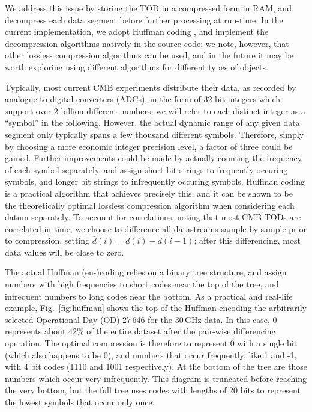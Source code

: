 \documentclass[twocolumn]{aa}
\begin{document}
We address this issue by storing the TOD in a compressed form in RAM,
and decompress each data segment before further processing at
run-time. In the current implementation, we adopt Huffman coding
\citep{Huffman}, and implement the decompression algorithms natively
in the source code; we note, however, that other lossless compression
algorithms can be used, and in the future it may be worth exploring
using different algorithms for different types of objects.

Typically, most current CMB experiments distribute their data, as
recorded by analogue-to-digital converters (ADCs), in the form of
32-bit integers which support over 2 billion different numbers; we
will refer to each distinct integer as a ``symbol'' in the
following. However, the actual dynamic range of any given data segment
only typically spans a few thousand different symbols. Therefore,
simply by choosing a more economic integer precision level, a factor
of three could be gained. Further improvements could be made by
actually counting the frequency of each symbol separately, and assign
short bit strings to frequently occuring symbols, and longer bit
strings to infrequently occuring symbols. Huffman coding is a
practical algorithm that achieves precisely this, and it can be shown
to be the theoretically optimal lossless compression algorithm when
considering each datum separately. To account for correlations, noting
that most CMB TODs are correlated in time, we choose to difference all
datastreams sample-by-sample prior to compression, setting $\bar{d}(i)
= d(i)-d(i-1)$; after this differencing, most data values will be
close to zero.

The actual Huffman (en-)coding relies on a binary tree structure, and
assign numbers with high frequencies to short codes near the top of
the tree, and infrequent numbers to long codes near the bottom.  As a
practical and real-life example, Fig.~\ref{fig:huffman} shows the top
of the Huffman encoding the arbitrarily selected Operational Day (OD)
27\,646 for the 30\,GHz data. In this case, 0 represents about 42\% of
the entire dataset after the pair-wise differencing operation. The
optimal compression is therefore to represent 0 with a single bit
(which also happens to be 0), and numbers that occur frequently, like
1 and -1, with 4 bit codes (1110 and 1001 respectively). At the bottom
of the tree are those numbers which occur very infrequently. This
diagram is truncated before reaching the very bottom, but the full
tree uses codes with lengths of 20 bits to represent the lowest
symbols that occur only once.
\end{document}
